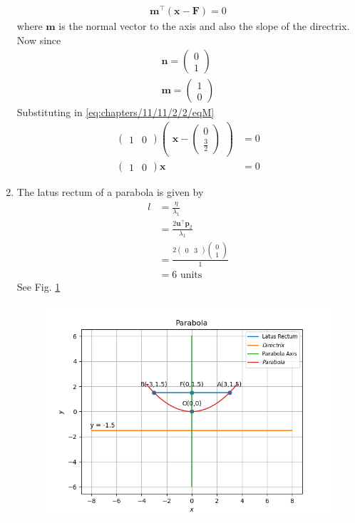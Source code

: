 \documentclass[12pt]{article}
\providecommand{\brak}[1]{\ensuremath{\left(#1\right)}}
\newcommand{\myvec}[1]{\ensuremath{\begin{pmatrix}#1\end{pmatrix}}}
\let\vec\mathbf
\begin{document}
\begin{enumerate}
\begin{align}
	\label{eq:chapters/11/11/2/2/eqM}
	\vec{m}^\top \brak{\vec{x}-\vec{F}} = 0
\end{align}
where $\vec{m}$ is the normal vector to the axis and also the slope of the directrix. Now since
\begin{align}
	\vec{n} = \myvec{0\\1}\\
	\vec{m} = \myvec{1\\0}
\end{align}
Substituting in \eqref{eq:chapters/11/11/2/2/eqM}
\begin{align}
	\myvec{1&0}\myvec{\vec{x}-\myvec{0\\\frac{3}{2}}}&=0\\
	\myvec{1&0}\vec{x} &= 0
\end{align}
\item The latus rectum of a parabola is given by
\begin{align}
	l&=\frac{\eta}{\lambda_1}\\
	 &=\frac{2\vec{u}^\top \vec{p}_2}{\lambda_1}\\
	 &=\frac{2\myvec{0&3}\myvec{0\\1}}{1}\\
	 &=6 \text{ units }
\end{align}
See Fig. \ref{fig:chapters/11/11/2/2/Fig1}
\begin{figure}[!h]
	\begin{center} 
	    \includegraphics[width=\columnwidth]{chapters/11/11/2/2/figs/parabola}
	\end{center}
\caption{}
\label{fig:chapters/11/11/2/2/Fig1}
\end{figure}
\end{enumerate}
\end{document}
